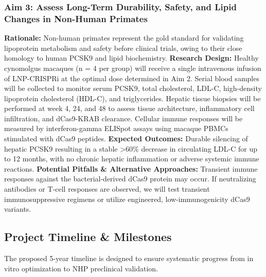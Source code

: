 \documentclass[11pt]{article}
\newcommand{\p}{\vspace{1.5mm}}
\begin{document}
\p
\subsubsection{Aim 3: Assess Long-Term Durability, Safety, and Lipid Changes in Non-Human Primates}
\textbf{Rationale:} Non-human primates represent the gold standard for validating lipoprotein metabolism and safety before clinical trials, owing to their close homology to human PCSK9 and lipid biochemistry.
\textbf{Research Design:} Healthy cynomolgus macaques (n = 4 per group) will receive a single intravenous infusion of LNP-CRISPRi at the optimal dose determined in Aim 2. Serial blood samples will be collected to monitor serum PCSK9, total cholesterol, LDL-C, high-density lipoprotein cholesterol (HDL-C), and triglycerides. Hepatic tissue biopsies will be performed at week 4, 24, and 48 to assess tissue architecture, inflammatory cell infiltration, and dCas9-KRAB clearance. Cellular immune responses will be measured by interferon-gamma ELISpot assays using macaque PBMCs stimulated with dCas9 peptides.
\textbf{Expected Outcomes:} Durable silencing of hepatic PCSK9 resulting in a stable >60\% decrease in circulating LDL-C for up to 12 months, with no chronic hepatic inflammation or adverse systemic immune reactions.
\textbf{Potential Pitfalls \& Alternative Approaches:} Transient immune responses against the bacterial-derived dCas9 protein may occur. If neutralizing antibodies or T-cell responses are observed, we will test transient immunosuppressive regimens or utilize engineered, low-immunogenicity dCas9 variants.

\p
\subsection{Project Timeline \& Milestones}
The proposed 5-year timeline is designed to ensure systematic progress from in vitro optimization to NHP preclinical validation.
\end{document}

